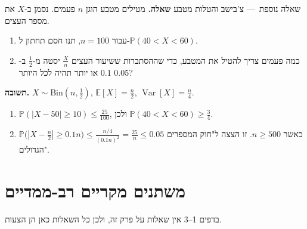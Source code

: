 \documentclass[11pt,a4paper]{report}
\newcommand{\PP}{\mathbb{P}}
\newcommand{\E}{\mathbb{E}}
\DeclareMathOperator{\Var}{Var}
\newcommand{\Bin}{\mathrm{Bin}}
\newcommand{\dash}{{\rmfamily —}}
\begin{document}
\begin{suggestion}{שאלה נוספת~\dash{} צ'בישב והטלות מטבע}
\textbf{שאלה.} מטילים מטבע הוגן $n$ פעמים. נסמן ב-$X$ את מספר העצים.
\begin{enumerate}[label=(\alph*),itemsep=1pt,topsep=2pt]
  \item עבור $n=100$, תנו חסם תחתון ל-$\PP(40<X<60)$.
  \item כמה פעמים צריך להטיל את המטבע, כדי שההסתברות ששיעור העצים $\frac Xn$ יסטה מ-$\frac12$ ב-$0.1$ או יותר תהיה לכל היותר $0.05$?
\end{enumerate}

\textbf{תשובה.} $X\sim\Bin(n,\frac12)$, $\E[X]=\frac n2$, $\Var[X]=\frac n4$.
\begin{enumerate}[label=(\alph*),itemsep=1pt,topsep=2pt]
  \item $\PP(|X-50|\ge10)\le\frac{25}{100}$, ולכן $\PP(40<X<60)\ge\frac34$.
  \item $\PP\big(|X-\frac n2|\ge0.1n\big)\le\frac{n/4}{(0.1n)^2}=\frac{25}n\le0.05$ כאשר $n\ge500$. זו הצצה ל"חוק המספרים הגדולים".
\end{enumerate}
\end{suggestion}


\chapter{משתנים מקריים רב-ממדיים}

בדפים 1--3 אין שאלות על פרק זה, ולכן כל השאלות כאן הן הצעות.
\end{document}
